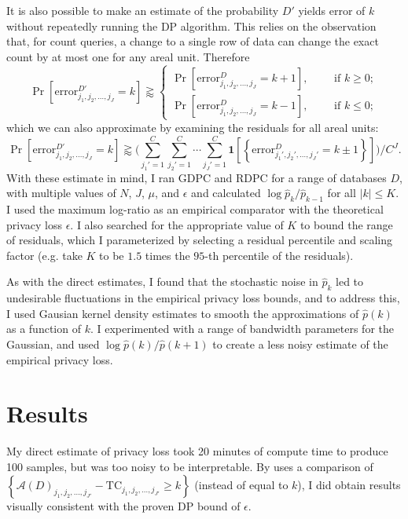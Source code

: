 \documentclass{article}
\begin{document}
It is also possible to make an estimate of the probability $D'$ yields error of $k$ without repeatedly running the DP algorithm.  This relies on the observation that, for count queries, a change to a single row of data can change the exact count by at most one for any areal unit.  Therefore
$$
\Pr\left[\mathrm{error}_{j_1, j_2, \ldots, j_{J}}^{D'}
= k\right]
\gtrapprox
\begin{cases}
\Pr\left[\mathrm{error}_{j_1, j_2, \ldots, j_{J}}^{D}
= k+1\right], \qquad \text{ if } k \geq 0;\\[.1in]
\Pr\left[\mathrm{error}_{j_1, j_2, \ldots, j_{J}}^{D}
= k-1\right], \qquad \text{ if } k \leq 0;
\end{cases}
$$
which we can also approximate by examining the residuals for all areal units:
$$\Pr\left[\mathrm{error}_{j_1, j_2, \ldots, j_{J}}^{D'}
= k\right]
\gtrapprox 
\bigg(\sum_{j_1'=1}^C\sum_{j_2'=1}^C\cdots\sum_{j_J' = 1}^C \mathbf{1}\left[\left\{\mathrm{error}_{j_1', j_2', \ldots, j_{J}'}^D
= k\pm 1\right\}\right]\bigg)\bigg/C^J.
$$
With these estimate in mind, I ran GDPC and RDPC for a range of databases $D$, with multiple values of $N$, $J$, $\mu$, and $\epsilon$ and calculated $\log \hat{p}_k / \hat{p}_{k-1}$ for all $|k| \leq K$. I used the maximum log-ratio as an empirical comparator with the theoretical privacy loss $\epsilon$.  I also searched for the appropriate value of $K$ to bound the range of residuals, which I parameterized by selecting a residual percentile and scaling factor (e.g. take $K$ to be $1.5$ times the $95$-th percentile of the residuals).

As with the direct estimates, I found that the stochastic noise in $\hat{p}_k$ led to undesirable fluctuations in the empirical privacy loss bounds, and to address this, I used Gausian kernel density estimates to smooth the approximations of $\hat{p}(k)$ as a function of $k$.  I experimented with a range of bandwidth parameters for the Gaussian, and used $\log \hat{p}(k) / \hat{p}(k+1)$ to create a less noisy estimate of the empirical privacy loss.

\section{Results}
\label{results}

My direct estimate of privacy loss took 20 minutes of compute time to produce 100 samples, but was too noisy to be interpretable.
By uses a comparison of $\left\{\mathcal{A}(D)_{j_1, j_2, \ldots, j_{J'}}
- \mathrm{TC}_{j_1, j_2, \ldots, j_{J'}}
\geq k\right\}$ (instead of equal to $k$), I did obtain results visually consistent with the proven DP bound of $\epsilon$.
\end{document}
